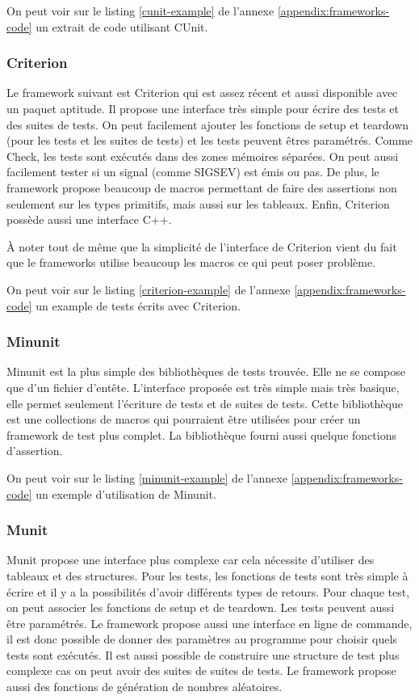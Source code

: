 \documentclass[a4paper]{article}
\begin{document}
On peut voir sur le listing \ref{cunit-example} de l'annexe
\ref{appendix:frameworks-code} un extrait de code utilisant CUnit.

\subsubsection*{Criterion}

Le framework suivant est Criterion qui est assez récent et aussi disponible avec
un paquet aptitude. Il propose une interface très simple pour écrire des tests
et des suites de tests. On peut facilement ajouter les fonctions de setup et
teardown (pour les tests et les suites de tests) et les tests peuvent êtres
paramétrés. Comme Check, les tests sont exécutés dans des zones mémoires
séparées. On peut aussi facilement tester si un signal (comme SIGSEV) est émis
ou pas. De plus, le framework propose beaucoup de macros permettant de faire des
assertions non seulement sur les types primitifs, mais aussi sur les tableaux.
Enfin, Criterion possède aussi une interface C++.

À noter tout de même que la simplicité de l'interface de Criterion vient du fait
que le frameworks utilise beaucoup les macros ce qui peut poser problème.

On peut voir sur le listing \ref{criterion-example} de l'annexe
\ref{appendix:frameworks-code} un example de tests écrits avec Criterion.

\subsubsection*{Minunit}

Minunit est la plus simple des bibliothèques de tests trouvée. Elle ne se
compose que d'un fichier d'entête. L'interface proposée est très simple mais
très basique, elle permet seulement l'écriture de tests et de suites de tests.
Cette bibliothèque est une collections de macros qui pourraient être utilisées
pour créer un framework de test plus complet. La bibliothèque fourni aussi
quelque fonctions d'assertion.

On peut voir sur le listing \ref{minunit-example} de l'annexe
\ref{appendix:frameworks-code} un exemple d'utilisation de Minunit.

\subsubsection*{Munit}

Munit propose une interface plus complexe car cela nécessite d'utiliser des
tableaux et des structures. Pour les tests, les fonctions de tests sont très
simple à écrire et il y a la possibilités d'avoir différents types de retours.
Pour chaque test, on peut associer les fonctions de setup et de teardown. Les
tests peuvent aussi être paramétrés. Le framework propose aussi une interface en
ligne de commande, il est donc possible de donner des paramètres au programme
pour choisir quels tests sont exécutés. Il est aussi possible de construire une
structure de test plus complexe cas on peut avoir des suites de suites de tests.
Le framework propose aussi des fonctions de génération de nombres aléatoires.
\end{document}
